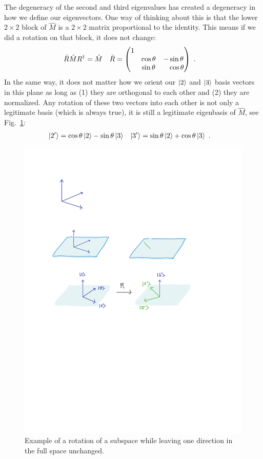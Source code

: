 \documentclass[12pt]{article}
\begin{document}
The degeneracy of the second and third eigenvalues has created a degeneracy in how we define our eigenvectors. One way of thinking about this is that the lower $2\times 2$ block of $\hat M$ is a $2\times 2$ matrix proportional to the identity. This means if we did a rotation on that block, it does not change:
\begin{align}
    \bar R \hat M R^\dag &= \hat M
    &
    \bar R&=
    \begin{pmatrix}
        1 & & \\
        & \cos\theta & -\sin\theta \\
        & \sin\theta & \pp \cos\theta
     \end{pmatrix} \ .
     \label{eq:rot:lower:2}
\end{align}
In the same way, it does not matter how we orient our $\left|2\right\rangle$ and $\left|3\right\rangle$ basis vectors in this plane as long as (1) they are orthogonal to each other and (2) they are normalized. Any rotation of these two vectors into each other is not only a legitimate basis (which is always true), it is still a legitimate eigenbasis of $\hat M$, see Fig.~\ref{fig:det:eig:rot}:
\begin{align}
    \left|2'\right\rangle &= \cos\theta \left|2\right\rangle -\sin\theta \left|3\right\rangle
    &
    \left|3'\right\rangle &= \sin\theta \left|2\right\rangle +\cos\theta \left|3\right\rangle \ .
\end{align}
% 
\begin{figure}[tb]
    \centering
    \includegraphics[width=.8\textwidth]{figures/deg_eig_rot.pdf}
    \caption{Example of a rotation of a subspace while leaving one direction in the full space unchanged.}
    \label{fig:det:eig:rot}
\end{figure}
% 
\end{document}
